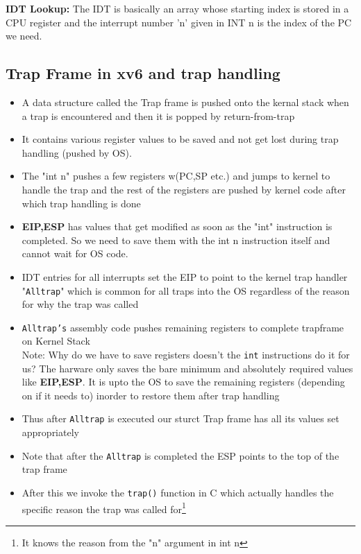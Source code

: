 \documentclass[12pt]{article}
\newcommand{\tbox}[1]{\noindent\fbox{\parbox{\textwidth}{#1}}}
\begin{document}
\textbf{IDT Lookup: }The IDT is basically an array whose starting index is stored in a CPU register and the interrupt number 'n' given in INT n is the index of the PC we need.
\noindent\tbox{
    \begin{center}
    \textbf{\Huge Lecture 7}
    \end{center}
}

\subsection{Trap Frame in xv6 and trap handling}
\begin{itemize}[topsep=0pt, partopsep=0pt, itemsep=0pt, parsep=0pt]
    \item A data structure called the Trap frame is pushed onto the kernal stack when a trap is encountered and then it is popped by return-from-trap
    \item It contains various register values to be saved and not get lost during trap handling (pushed by OS).
    \item The "int n" pushes a few registers w(PC,SP etc.) and jumps to kernel to handle the trap and the rest of the registers are pushed by kernel code after which trap handling is done
    \item \textbf{EIP,ESP} has values that get modified as soon as the "int" instruction is completed. So we need to save them with the int n instruction itself and cannot wait for OS code.
    \item IDT entries for all interrupts set the EIP to point to the kernel trap handler "\texttt{Alltrap}" which is common for all traps into the OS regardless of the reason for why the trap was called
    \item \texttt{Alltrap's} assembly code pushes remaining registers to complete trapframe on Kernel Stack
   \\ Note: Why do we have to save registers doesn't the \texttt{int} instructions do it for us? The harware only saves the bare minimum and absolutely required values like \textbf{EIP,ESP}.
   It is upto the OS to save the remaining registers (depending on if it needs to) inorder to restore them after trap handling
   \item Thus after \texttt{Alltrap} is executed our sturct Trap frame has all its values set appropriately
    \item Note that after the \texttt{Alltrap} is completed the ESP points to the top of the trap frame
    \item After this we invoke the \texttt{trap()} function in C which actually handles the specific reason the trap was called for\footnote{It knows the reason from the "n" argument in int n}
\end{itemize}
\end{document}
